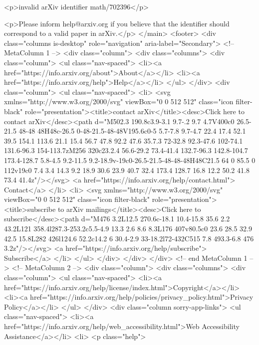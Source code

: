 <p>invalid arXiv identifier math/702396</p>

<p>Please inform help@arxiv.org if you believe that the identifier should correspond to a valid paper in arXiv.</p>  </main>
  <footer>
<div class="columns is-desktop" role="navigation" aria-label="Secondary">
  <!-- MetaColumn 1 -->
  <div class="column">
    <div class="columns">
      <div class="column">
        <ul class="nav-spaced">
          <li><a href="https://info.arxiv.org/about">About</a></li>
          <li><a href="https://info.arxiv.org/help">Help</a></li>
        </ul>
      </div>
      <div class="column">
        <ul class="nav-spaced">
          <li>
            <svg xmlns="http://www.w3.org/2000/svg" viewBox="0 0 512 512" class="icon filter-black" role="presentation"><title>contact arXiv</title><desc>Click here to contact arXiv</desc><path d="M502.3 190.8c3.9-3.1 9.7-.2 9.7 4.7V400c0 26.5-21.5 48-48 48H48c-26.5 0-48-21.5-48-48V195.6c0-5 5.7-7.8 9.7-4.7 22.4 17.4 52.1 39.5 154.1 113.6 21.1 15.4 56.7 47.8 92.2 47.6 35.7.3 72-32.8 92.3-47.6 102-74.1 131.6-96.3 154-113.7zM256 320c23.2.4 56.6-29.2 73.4-41.4 132.7-96.3 142.8-104.7 173.4-128.7 5.8-4.5 9.2-11.5 9.2-18.9v-19c0-26.5-21.5-48-48-48H48C21.5 64 0 85.5 0 112v19c0 7.4 3.4 14.3 9.2 18.9 30.6 23.9 40.7 32.4 173.4 128.7 16.8 12.2 50.2 41.8 73.4 41.4z"/></svg>
            <a href="https://info.arxiv.org/help/contact.html"> Contact</a>
          </li>
          <li>
            <svg xmlns="http://www.w3.org/2000/svg" viewBox="0 0 512 512" class="icon filter-black" role="presentation"><title>subscribe to arXiv mailings</title><desc>Click here to subscribe</desc><path d="M476 3.2L12.5 270.6c-18.1 10.4-15.8 35.6 2.2 43.2L121 358.4l287.3-253.2c5.5-4.9 13.3 2.6 8.6 8.3L176 407v80.5c0 23.6 28.5 32.9 42.5 15.8L282 426l124.6 52.2c14.2 6 30.4-2.9 33-18.2l72-432C515 7.8 493.3-6.8 476 3.2z"/></svg>
            <a href="https://info.arxiv.org/help/subscribe"> Subscribe</a>
          </li>
        </ul>
      </div>
    </div>
  </div> <!-- end MetaColumn 1 -->
  <!-- MetaColumn 2 -->
  <div class="column">
    <div class="columns">
      <div class="column">
        <ul class="nav-spaced">
          <li><a href="https://info.arxiv.org/help/license/index.html">Copyright</a></li>
          <li><a href="https://info.arxiv.org/help/policies/privacy_policy.html">Privacy Policy</a></li>
        </ul>
      </div>
      <div class="column sorry-app-links">
        <ul class="nav-spaced">
          <li><a href="https://info.arxiv.org/help/web_accessibility.html">Web Accessibility Assistance</a></li>
          <li>
            <p class="help">
